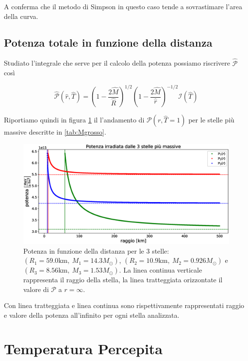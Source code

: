 \documentclass[a4paper, titlepage]{article}
\begin{document}
A conferma che il metodo di Simpson in questo caso tende a sovrastimare l'area della curva.


\subsection{Potenza totale in funzione della distanza}

Studiato l'integrale che serve per il calcolo della potenza possiamo riscrivere $\mathcal{\hat P}$ così

\begin{equation}
    \mathcal{\hat P} (\hat r, \hat T) = \left(1 - \frac{2 \hat M}{\hat R} \right)^{1/2} \left(1 - \frac{2 \hat M}{\hat r} \right)^{-1/2} \mathcal I (\hat T)
    \label{eq:Pot_I}
\end{equation}

Riportiamo quindi in figura \ref{fig:Pot} il l'andamento di $\mathcal P (r, \hat T = 1)$ per le stelle più massive descritte in \ref{tab:Mgrosso}.

\begin{figure}[h]
    \centering
    \includegraphics[width = \textwidth]{Figures/Pot.eps}
    \caption{Potenza in funzione della distanza per le 3 stelle: $(R_1 = 59.0 \unit{\kilo\meter},~M_1 = 14.3 M_\odot)$, $(R_2 = 10.9 \unit{\kilo\meter},~M_2 = 0.926 M_\odot)$ e $(R_3 = 8.56 \unit{\kilo\meter},~M_3 = 1.53 M_\odot)$.
    La linea continua verticale rappresenta il raggio della stella, la linea tratteggiata orizzontate il valore di $\mathcal{P}$ a $r = \infty$.}
    \label{fig:Pot}
\end{figure}

Con linea tratteggiata e linea continua sono rispettivamente rappresentati raggio e valore della potenza all'infinito per ogni stella analizzata.



\newpage
\section{Temperatura Percepita}
\end{document}
